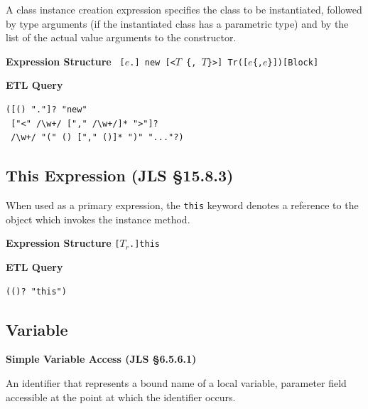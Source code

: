 \begin{chapterBody}
A class instance creation expression specifies the class to be instantiated,
followed by type arguments (if the instantiated class has a parametric 
type) and by the list of the actual value arguments to the constructor.
\vspace{1em}

\begin{minipage}[t]{.45\linewidth}
\textbf{Expression Structure} \hfill\break
\texttt{
[$e$.] {\color{bp-blue}new}
\hfill\break\hspace*{0.5em}
[{\color{bp-blue}<}$T$ \{, $T$\}{\color{bp-blue}>}]
\hfill\break\hspace*{0.5em}
Tr{\color{bp-blue}(}[$e$\{,$e$\}]{\color{bp-blue})}[Block]
} \\ 
\end{minipage}
\begin{minipage}[t]{.45\linewidth}
\textbf{ETL Query}
\begin{lstlisting}[language=etl]
([() "."]? "new" 
 ["<" /\w+/ ["," /\w+/]* ">"]?
 /\w+/ "(" () ["," ()]* ")" "..."?)
\end{lstlisting}
\end{minipage}

\subsection*{This Expression (JLS \S15.8.3)}

When used as a primary expression, the \texttt{this} keyword denotes a
reference to the object which invokes the instance method.
\vspace{1em}

\begin{minipage}[t]{.45\linewidth}
\textbf{Expression Structure} \hfill\break
\texttt{[$T_r$.]{\color{bp-blue}this}}
\end{minipage}
\begin{minipage}[t]{.45\linewidth}
\textbf{ETL Query}
\begin{lstlisting}[language=etl]
(()? "this")
\end{lstlisting}
\end{minipage}

\subsection*{Variable}

\noindent\textbf{Simple Variable Access (JLS \S6.5.6.1)}

An identifier that represents a bound name of a local variable, parameter
field accessible at the point at which the identifier occurs.
\vspace{1em}


\end{chapterBody}
